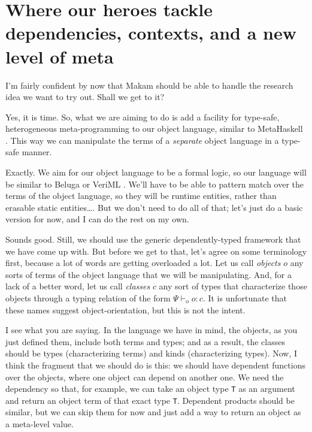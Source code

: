 \section{Where our heroes tackle dependencies, contexts, and a new level
of
meta}\label{where-our-heroes-tackle-dependencies-contexts-and-a-new-level-of-meta}

\heroSTUDENT{} I'm fairly confident by now that Makam should be able to handle
the research idea we want to try out. Shall we get to it?

\heroADVISOR{} Yes, it is time. So, what we are aiming to do is add a facility
for type-safe, heterogeneous meta-programming to our object language,
similar to MetaHaskell \citep{mainland2012explicitly}. This way we can
manipulate the terms of a \emph{separate} object language in a type-safe
manner.

\heroSTUDENT{} Exactly. We aim for our object language to be a formal logic,
so our language will be similar to Beluga \citep{beluga-main-reference}
or VeriML \citep{veriml-main-reference}. We'll have to be able to
pattern match over the terms of the object language, so they will be
runtime entities, rather than erasable static entities\ldots{}. But we
don't need to do all of that; let's just do a basic version for now, and
I can do the rest on my own.

\newcommand\dep[1]{\ensuremath{#1}}
\newcommand\lift[1]{\ensuremath{\langle#1\rangle}}
\newcommand\odash[0]{\ensuremath{\vdash_{\text{o}}}}
\newcommand\wf[0]{\ensuremath{\; \text{wf}}}

\heroADVISOR{} Sounds good. Still, we should use the generic dependently-typed
framework that we have come up with. But before we get to that, let's
agree on some terminology first, because a lot of words are getting
overloaded a lot. Let us call \emph{objects} \(o\) any sorts of terms of
the object language that we will be manipulating. And, for a lack of a
better word, let us call \emph{classes} \(c\) any sort of types that
characterize those objects through a typing relation of the form
\(\Psi \odash o : c\). It is unfortunate that these names suggest
object-orientation, but this is not the intent.

\heroSTUDENT{} I see what you are saying. In the language we have in mind, the
objects, as you just defined them, include both terms and types; and as
a result, the classes should be types (characterizing terms) and kinds
(characterizing types). Now, I think the fragment that we should do is
this: we should have dependent functions over the objects, where one
object can depend on another one. We need the dependency so that, for
example, we can take an object type \texttt{T} as an argument and return
an object term of that exact type \texttt{T}. Dependent products should
be similar, but we can skip them for now and just add a way to return an
object as a meta-level value.

